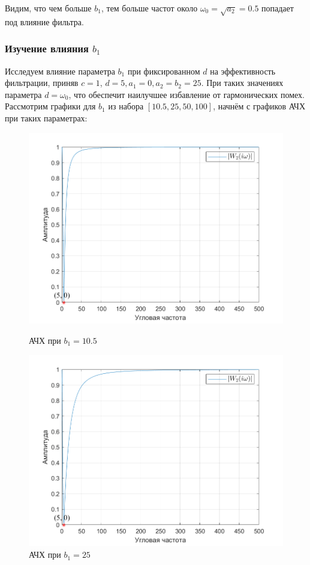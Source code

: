 \documentclass[a4paper]{article}
\begin{document}
Видим, что чем больше $b_1$, тем больше частот около $\omega_0 = \sqrt{a_2} = 0.5$ попадает под влияние фильтра.

\subsubsection{Изучение влияния $b_1$}

Исследуем влияние параметра $b_1$ при фиксированном $d$ на эффективность фильтрации, приняв $c = 1$, $d = 5, a_1 = 0, a_2 = b_2 = 25$. При таких значениях параметра $d = \omega_0$, что обеспечит наилучшее избавление от гармонических помех. Рассмотрим графики для $b_1$ из набора $[10.5, 25, 50, 100]$, начнём с графиков АЧХ при таких параметрах:

\begin{figure}[H]
    \begin{minipage}{0.5\textwidth}
        \centering
        \includegraphics[width=\linewidth]{ex1_2/a1=0_a2=25_b1=10.5_b2=25_d=5/h1.png}
        \caption{АЧХ при $b_1=10.5$}
    \end{minipage}
    \begin{minipage}{0.5\textwidth}
        \centering
        \includegraphics[width=\linewidth]{ex1_2/a1=0_a2=25_b1=25_b2=25_d=5/h1.png}
        \caption{АЧХ при $b_1=25$}
    \end{minipage}
\end{figure}
\end{document}
